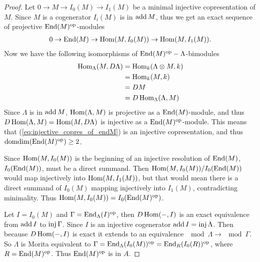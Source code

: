 \begin{prop}
\begin{proof}
		Let $0 \to M \to I_0(M) \to I_1(M)$ be a minimal injective copresentation of $M$. Since $M$ is a cogenerator $I_i(M)$ is in $\operatorname{add} M$, thus we get an exact sequence of projective $\operatorname{End}(M)^{\operatorname{op}}$-modules
		\begin{align} \label{eq:injective_copres_of_endM}
		0 \to \operatorname{End}(M) \to \operatorname{Hom}(M, I_0(M)) \to \operatorname{Hom}(M, I_1(M)).
		\end{align}
		Now we have the following isomorphisms of $\operatorname{End}(M)^{\operatorname{op}}-\Lambda$-bimodules
		\begin{align*}
		\operatorname{Hom}_\Lambda(M, D\Lambda) &=
		\operatorname{Hom}_k(\Lambda\otimes M, k) \\&=
		\operatorname{Hom}_k(M, k) \\&=
		DM \\&=
		D\operatorname{Hom}_\Lambda(\Lambda, M)
		\end{align*}
		Since $\Lambda$ is in $\operatorname{add} M$, $\operatorname{Hom}(\Lambda, M)$ is projective as a $\operatorname{End}(M)$-module, and thus $D\operatorname{Hom}(\Lambda, M) = \operatorname{Hom}(M, D\Lambda)$ is injective as a $\operatorname{End}(M)^{\operatorname{op}}$-module. This means that (\ref{eq:injective_copres_of_endM}) is an injective copresentation, and thus $\operatorname{domdim}(\operatorname{End}(M)^{\operatorname{op}}) \geq 2$.
		
		Since $\operatorname{Hom}(M, I_0(M))$ is the beginning of an injective resolution of $\operatorname{End}(M)$, $I_0(\operatorname{End}(M))$, must be a direct summand. Then $\operatorname{Hom}(M, I_0(M)) / I_0(\operatorname{End}(M))$ would map injectively into $\operatorname{Hom}(M, I_1(M))$, but that would mean there is a direct summand of $I_0(M)$ mapping injectively into $I_1(M)$, contradicting minimality. Thus $\operatorname{Hom}(M, I_0(M)) = I_0(\operatorname{End}(M)^{\operatorname{op}})$.
		
		Let $I=I_0(M)$ and $\Gamma = \operatorname{End}_\Lambda(I)^{\operatorname{op}}$, then $D\operatorname{Hom}(-,I)$ is an exact equivalence from $\operatorname{add} I$ to $\operatorname{inj}\Gamma$. Since $I$ is an injective cogenerator $\operatorname{add} I = \operatorname{inj}\Lambda$. Then because $D\operatorname{Hom}(-,I)$ is exact it extends to an equivalence $\mod\Lambda \to \mod\Gamma$. So $\Lambda$ is Morita equivalent to $\Gamma = \operatorname{End}_{\Lambda}(I_0(M))^{\operatorname{op}} = \operatorname{End}_{R}(I_0(R))^{\operatorname{op}}$, where $R=\operatorname{End}(M)^{\operatorname{op}}$. Thus $\operatorname{End}(M)^{\operatorname{op}}$ is in $A$.
	\end{proof}
\end{prop}

